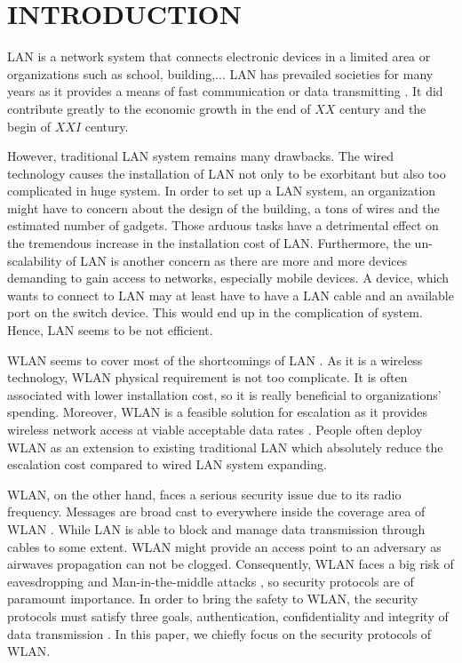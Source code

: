 \section{INTRODUCTION}

\ac{LAN} \cite{stallings1984local} is a network system that connects electronic devices in a limited area or organizations such as school, building,...  LAN has prevailed societies for many years as it provides a means of fast communication or data transmitting \cite{schultheis1988designing}. It did contribute greatly to the economic growth in the end of $XX$ century and the begin of $XXI$ century.

However, traditional \ac{LAN} system remains many drawbacks. The wired technology causes the installation of \ac{LAN} not only to be exorbitant but also too complicated in huge system. In order to set up a \ac{LAN} system, an organization might have to concern about the design of the building, a tons of wires and the estimated number of gadgets. Those arduous tasks have  a detrimental effect on the tremendous increase in the installation cost of \ac{LAN}. Furthermore, the un-scalability of \ac{LAN} is another concern as there are more and more devices demanding to gain access to networks, especially mobile devices. A device, which wants to connect to \ac{LAN} may at least have to have a \ac{LAN} cable and an available port on the switch device. This would end up in the complication of system. Hence, \ac{LAN} seems to be not efficient.

\ac{WLAN} seems to cover most of the shortcomings of \ac{LAN} \cite{al2006ieee}.  As it is a wireless technology, \ac{WLAN} physical requirement is not too complicate. It is often associated with lower installation cost, so it is really beneficial to organizations' spending. Moreover, \ac{WLAN} is a feasible solution for escalation as it provides wireless network access at viable acceptable data rates \cite{al2006ieee}. People often deploy \ac{WLAN} as an extension to existing traditional \ac{LAN} which absolutely reduce the escalation cost compared to wired \ac{LAN} system expanding.

\ac{WLAN}, on the other hand, faces a serious security issue due to its radio frequency. Messages are broad cast to everywhere inside the coverage area of \ac{WLAN} \cite{ieee1999802, shin2006wireless}. While \ac{LAN} is able to block and manage data transmission through cables to some extent. \ac{WLAN} might provide an access point to an adversary as airwaves propagation can not be clogged. Consequently, \ac{WLAN} faces a big risk of eavesdropping and Man-in-the-middle attacks \cite{shunman2003wlan}, so security protocols are of paramount importance. In order to bring the safety to \ac{WLAN}, the security protocols must satisfy three goals, authentication, confidentiality and integrity of data transmission \cite{gast2005802}. In this paper, we chiefly focus on the security protocols of \ac{WLAN}.

